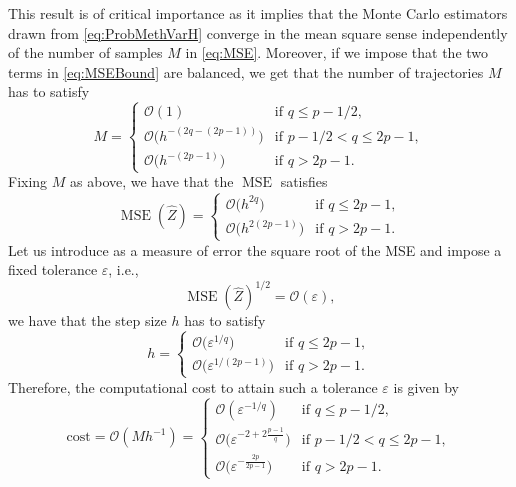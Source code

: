\documentclass{siamart1116}
\numberwithin{theorem}{section}
\newcommand{\OO}{\mathcal{O}}
\newcommand{\epl}{\varepsilon}
\newcommand{\MSE}{\operatorname{MSE}}
\begin{document}
\begin{remark} This result is of critical importance as it implies that the Monte Carlo estimators drawn from \eqref{eq:ProbMethVarH} converge in the mean square sense independently of the number of samples $M$ in \eqref{eq:MSE}. Moreover, if we impose that the two terms in \eqref{eq:MSEBound} are balanced, we get that the number of trajectories $M$ has to satisfy
	\begin{equation}
		M = \begin{cases} 
			\OO(1) & \mbox{if } q \leq p - 1/2, \\
			\OO\big(h^{-(2q - (2p-1))}\big) & \mbox{if } p-1/2 < q \leq 2p - 1, \\
			\OO\big(h^{-(2p-1)}\big) & \mbox{if } q > 2p - 1.
		\end{cases}
	\end{equation}
	Fixing $M$ as above, we have that the $\MSE$ satisfies 
	\begin{equation}
		\MSE(\hat Z) = \begin{cases} 
					   \OO\big(h^{2q}\big) & \mbox{if } q \leq 2p - 1, \\
					   \OO\big(h^{2(2p - 1)}\big) & \mbox{if } q > 2p - 1.
					   \end{cases}
	\end{equation}
	Let us introduce as a measure of error the square root of the MSE and impose a fixed tolerance $\epl$, i.e.,
	\begin{equation}
		\MSE(\hat Z)^{1/2} = \OO(\epl),
	\end{equation}
	we have that the step size $h$ has to satisfy
	\begin{equation}
		h = \begin{cases} 
			\OO\big(\epl^{1 / q}\big) & \mbox{if } q \leq 2p - 1, \\
			\OO\big(\epl^{1 / (2p - 1)}\big) & \mbox{if } q > 2p - 1.
			\end{cases}
	\end{equation}
	Therefore, the computational cost to attain such a tolerance $\epl$ is given by
	\begin{equation}
		\mathrm{cost} = \OO(Mh^{-1}) = \begin{cases} 
										   \OO(\epl^{-1/q}) & \mbox{if } q \leq p - 1/2, \\
										   \OO\big(\epl^{-2 + 2 \frac{p - 1}{q}}\big) & \mbox{if } p-1/2 < q \leq 2p - 1, \\
										   \OO\big(\epl^{-\frac{2p}{2p - 1}}\big) & \mbox{if } q > 2p - 1.
									   \end{cases}
	\end{equation}
\end{remark} 
\end{document}
